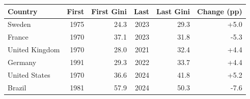 \begin{tabular}{lrrrrr}
\toprule
Country & First & First Gini & Last & Last Gini & Change (pp) \\
\midrule
Sweden & 1975 & 24.3 & 2023 & 29.3 & +5.0 \\
France & 1970 & 37.1 & 2023 & 31.8 & -5.3 \\
United Kingdom & 1970 & 28.0 & 2021 & 32.4 & +4.4 \\
Germany & 1991 & 29.3 & 2022 & 33.7 & +4.4 \\
United States & 1970 & 36.6 & 2024 & 41.8 & +5.2 \\
Brazil & 1981 & 57.9 & 2024 & 50.3 & -7.6 \\
\bottomrule
\end{tabular}
